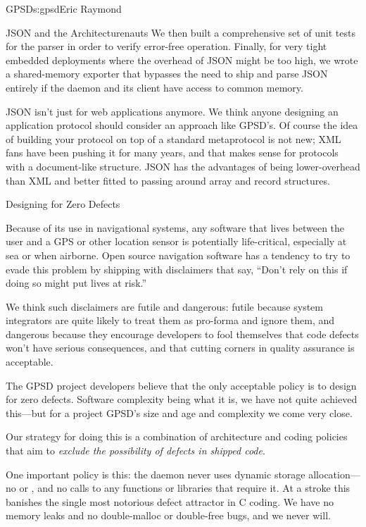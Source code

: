 \begin{aosachapter}{GPSD}{s:gpsd}{Eric Raymond}
\begin{aosasect1}{JSON and the Architecturenauts}
We then built a comprehensive set of unit tests for the parser 
in order to verify error-free operation. Finally, for very tight
embedded deployments where the overhead of JSON might be too high,
we wrote a shared-memory exporter that bypasses the need to
ship and parse JSON entirely if the daemon and its client have
access to common memory.

JSON isn't just for web applications anymore.  We think anyone
designing an application protocol should consider an approach like
GPSD's.  Of course the idea of building your protocol on top of a
standard metaprotocol is not new; XML fans have been pushing it for
many years, and that makes sense for protocols with a document-like
structure. JSON has the advantages of being lower-overhead than XML
and better fitted to passing around array and record structures.

\end{aosasect1}

\begin{aosasect1}{Designing for Zero Defects}

Because of its use in navigational systems, any software that lives
between the user and a GPS or other location sensor is potentially
life-critical, especially at sea or when airborne.  Open source
navigation software has a tendency to try to evade this problem by
shipping with disclaimers that say, ``Don't rely on this if doing so
might put lives at risk.''

We think such disclaimers are futile and dangerous: futile because
system integrators are quite likely to treat them as pro-forma and
ignore them, and dangerous because they encourage developers to fool
themselves that code defects won't have serious consequences, and that
cutting corners in quality assurance is acceptable.

The GPSD project developers believe that the only acceptable policy is
to design for zero defects. Software complexity being what it is, we
have not quite achieved this---but for a project GPSD's size and age
and complexity we come very close.

Our strategy for doing this is a combination of architecture and
coding policies that aim to \emph{exclude the possibility of defects in
shipped code}.

One important policy is this: the  daemon never uses
dynamic storage allocation---no  or , and no
calls to any functions or libraries that require it.  At a stroke
this banishes the single most notorious defect attractor in C coding.
We have no memory leaks and no double-malloc or double-free bugs, and
we never will.


\end{aosasect1}
\end{aosachapter}

